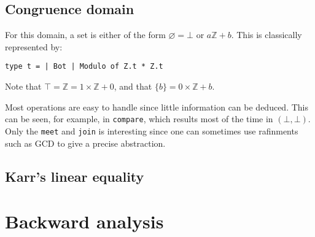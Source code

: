 \documentclass[12pt,a4paper]{article}
\begin{document}
\subsection{Congruence domain}
For this domain, a set is either of the form $\varnothing=\bot$ or $a\mathbb{Z}+b$. This is classically represented by:
\begin{center}
    \texttt{type t = | Bot | Modulo of Z.t * Z.t}
\end{center}
Note that $\top=\mathbb{Z}=1\times\mathbb{Z}+0$, and that $\{b\}=0\times\mathbb{Z}+b$.

Most operations are easy to handle since little information can be deduced. This can be seen, for example, in \texttt{compare}, which results most of the time in $(\bot, \bot)$. Only the \texttt{meet} and \texttt{join} is interesting since one can sometimes use rafinments such as GCD to give a precise abstraction.

\subsection{Karr's linear equality}

\section{Backward analysis}
\end{document}
